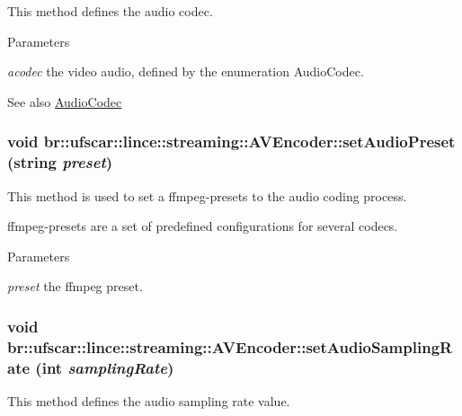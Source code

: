 This method defines the audio codec. 


\begin{DoxyParams}{Parameters}
\item[{\em acodec}]the video audio, defined by the enumeration AudioCodec. \end{DoxyParams}
\begin{DoxySeeAlso}{See also}
\hyperlink{namespacebr_1_1ufscar_1_1lince_1_1streaming_ad12fee1ac355f8db230ab5a750cbe2b2}{AudioCodec} 
\end{DoxySeeAlso}
\hypertarget{classbr_1_1ufscar_1_1lince_1_1streaming_1_1AVEncoder_a93c771242ed2751987f03f7606d81fed}{
\subsubsection[{setAudioPreset}]{\setlength{\rightskip}{0pt plus 5cm}void br::ufscar::lince::streaming::AVEncoder::setAudioPreset (string {\em preset})}}
\label{classbr_1_1ufscar_1_1lince_1_1streaming_1_1AVEncoder_a93c771242ed2751987f03f7606d81fed}


This method is used to set a ffmpeg-\/presets to the audio coding process. 

ffmpeg-\/presets are a set of predefined configurations for several codecs. 
\begin{DoxyParams}{Parameters}
\item[{\em preset}]the ffmpeg preset. \end{DoxyParams}
\hypertarget{classbr_1_1ufscar_1_1lince_1_1streaming_1_1AVEncoder_ae80e3a12354fa692e6af5e7cdd4726fa}{
\subsubsection[{setAudioSamplingRate}]{\setlength{\rightskip}{0pt plus 5cm}void br::ufscar::lince::streaming::AVEncoder::setAudioSamplingRate (int {\em samplingRate})}}
\label{classbr_1_1ufscar_1_1lince_1_1streaming_1_1AVEncoder_ae80e3a12354fa692e6af5e7cdd4726fa}


This method defines the audio sampling rate value. 


